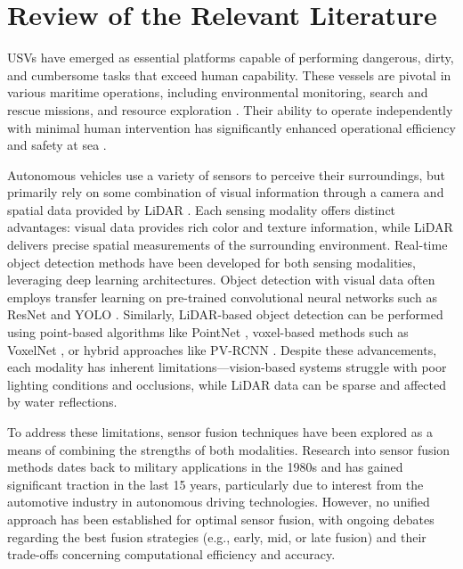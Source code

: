 \documentclass{erauthesis}
\begin{document}
\chapter{Review of the Relevant Literature} \label{litReview}


\acp{USV} have emerged as essential platforms capable of performing dangerous, dirty, and cumbersome tasks that exceed human capability. These vessels are pivotal in various maritime operations, including environmental monitoring, search and rescue missions, and resource exploration \cite{liebergall, eckstein2024}.%
Their ability to operate independently with minimal human intervention has significantly enhanced operational efficiency and safety at sea \cite{bai2022}.%

Autonomous vehicles use a variety of sensors to perceive their surroundings, but primarily rely on some combination of visual information through a camera and spatial data provided by \ac{LiDAR} \cite{yeong2021}.%
Each sensing modality offers distinct advantages: visual data provides rich color and texture information, while \ac{LiDAR} delivers precise spatial measurements of the surrounding environment.
Real-time object detection methods have been developed for both sensing modalities, leveraging deep learning architectures.
Object detection with visual data often employs transfer learning on pre-trained convolutional neural networks such as ResNet \cite{he2016} and \ac{YOLO} \cite{ultralytics}.%
Similarly, \ac{LiDAR}-based object detection can be performed using point-based algorithms like PointNet \cite{garcia-garcia2016}, voxel-based methods such as VoxelNet \cite{zhou2018a}, or hybrid approaches like PV-RCNN \cite{shi2021}.%
Despite these advancements, each modality has inherent limitations—vision-based systems struggle with poor lighting conditions and occlusions, while \ac{LiDAR} data can be sparse and affected by water reflections.

To address these limitations, sensor fusion techniques have been explored as a means of combining the strengths of both modalities. 
Research into sensor fusion methods dates back to military applications in the 1980s and has gained significant traction in the last 15 years, particularly due to interest from the automotive industry in autonomous driving technologies. However, no unified approach has been established for optimal sensor fusion, with ongoing debates regarding the best fusion strategies (e.g., early, mid, or late fusion) and their trade-offs concerning computational efficiency and accuracy.
\end{document}
